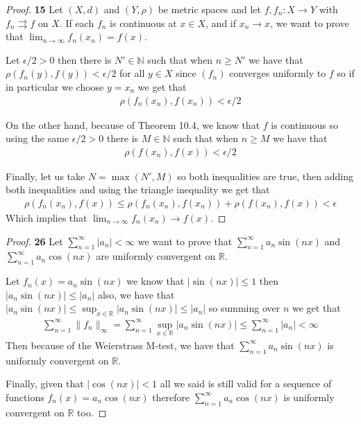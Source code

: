 \documentclass[11pt]{article}
\newcommand{\N}{\mathbb{N}}
\newcommand{\R}{\mathbb{R}}
\theoremstyle{definition}
\begin{document}
\begin{proof}{\textbf{15}}
    Let $(X,d)$ and $(Y,\rho)$ be metric spaces and let $f,f_n:X \to Y$ with
    $f_n\rightrightarrows f$ on $X$. If each $f_n$ is continuous at $x \in X$,
    and if $x_n \to x$, we want to prove that
    $\lim_{n\to\infty} f_n(x_n) = f(x)$.

    Let $\epsilon/2 > 0$ then there is $N' \in \N$ such that when $n \geq N'$ we
    have that $\rho(f_n(y), f(y)) < \epsilon/2$ for all $y \in X$ since 
    $(f_n)$ converges uniformly to $f$ so if in particular
    we choose $y = x_n$ we get that
    \begin{align*}
        \rho(f_n(x_n), f(x_n)) < \epsilon/2
    \end{align*}

    On the other hand, because of Theorem 10.4, we know that $f$ is continuous
    so using the same $\epsilon/2 > 0$ there is $M \in \N$ such that when
    $n \geq M$ we have that
    \begin{align*}
        \rho(f(x_n), f(x)) < \epsilon/2
    \end{align*}
    
    Finally, let us take $N = \max(N', M)$ so both inequalities are true, then
    adding both inequalities and using the triangle inequality
    we get that
    \begin{align*}
        \rho(f_n(x_n), f(x))
        \leq \rho(f_n(x_n), f(x_n)) + \rho(f(x_n), f(x)) < \epsilon
    \end{align*}
    Which implies that $\lim_{n \to \infty} f_n(x_n) \to f(x)$.

\end{proof}
\cleardoublepage
\begin{proof}{\textbf{26}}
    Let $\sum_{n=1}^\infty |a_n| < \infty$ we want to prove that
    $\sum_{n=1}^\infty a_n \sin(nx)$ and $\sum_{n=1}^\infty a_n \cos(nx)$
    are uniformly convergent on $\R$.

    Let $f_n(x) = a_n \sin(nx)$ we know that $|\sin(nx)| \leq 1$ then
    $|a_n \sin(nx)| \leq |a_n|$ also, we have that
    $|a_n \sin(nx)| \leq \sup_{x\in\R}|a_n \sin(nx)| \leq |a_n|$
    so summing over $n$ we get that
    \begin{align*}
        \sum_{n=1}^\infty \|f_n\|_\infty = \sum_{n=1}^\infty \sup_{x\in\R}|a_n\sin(nx)|
        \leq \sum_{n=1}^\infty |a_n| < \infty
    \end{align*}
    Then because of the Weierstrass M-test, we have that 
    $\sum_{n=1}^\infty a_n \sin(nx)$ is uniformly convergent on $\R$.

    Finally, given that $|\cos(nx)| < 1$ all we said is still valid for a
    sequence of functions $f_n(x) = a_n\cos(nx)$ therefore
    $\sum_{n=1}^\infty a_n \cos(nx)$ is uniformly convergent on $\R$ too.
\end{proof}
\end{document}
